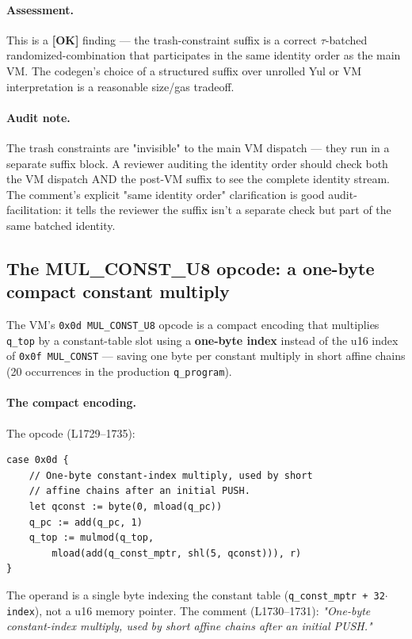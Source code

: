 \paragraph{Assessment.} This is a
\textcolor{tracegreen}{\textbf{[OK]}} finding --- the
trash-constraint suffix is a correct $\tau$-batched
randomized-combination that participates in the same identity
order as the main VM. The codegen's choice of a structured suffix
over unrolled Yul or VM interpretation is a reasonable
size/gas tradeoff.

\paragraph{Audit note.} The trash constraints are "invisible" to
the main VM dispatch --- they run in a separate suffix block. A
reviewer auditing the identity order should check both the VM
dispatch AND the post-VM suffix to see the complete identity
stream. The comment's explicit "same identity order" clarification
is good audit-facilitation: it tells the reviewer the suffix
isn't a separate check but part of the same batched identity.

\subsection{The MUL\_CONST\_U8 opcode: a one-byte compact constant multiply}
\label{sec:pr-mulconst}

The VM's \texttt{0x0d MUL\_\allowbreak{}CONST\_\allowbreak{}U8} opcode is a compact
encoding that multiplies \texttt{q\_top} by a constant-table slot
using a \textbf{one-byte index} instead of the u16 index of
\texttt{0x0f MUL\_CONST} --- saving one byte per constant
multiply in short affine chains (20 occurrences in the production
\texttt{q\_program}).

\paragraph{The compact encoding.} The opcode (L1729--1735):
\begin{lstlisting}[style=yul]
case 0x0d {
    // One-byte constant-index multiply, used by short
    // affine chains after an initial PUSH.
    let qconst := byte(0, mload(q_pc))
    q_pc := add(q_pc, 1)
    q_top := mulmod(q_top,
        mload(add(q_const_mptr, shl(5, qconst))), r)
}
\end{lstlisting}
The operand is a single byte indexing the constant table
(\texttt{q\_\allowbreak{}const\_\allowbreak{}mptr + 32$\cdot$index}), not a u16 memory
pointer. The comment (L1730--1731): \emph{"One-byte
constant-index multiply, used by short affine chains after an
initial PUSH."}

